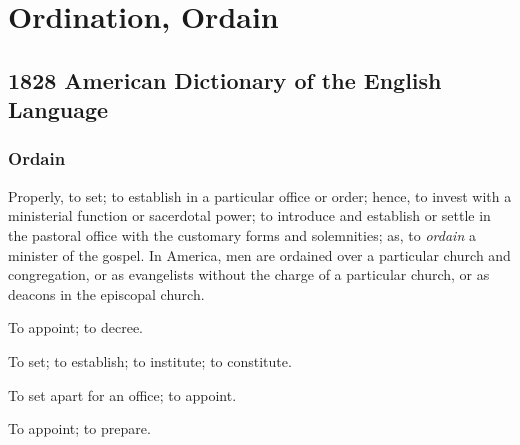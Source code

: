 \section{Ordination, Ordain}
	\label{ORDINATION}
	

\subsection{1828 American Dictionary of the English Language} %
	\label{ORDINATION-1828}
	
	\subsubsection{Ordain}

		\begin{compactitem}
			\item[1] Properly, to set; to establish in a particular office or order; hence, to invest with a ministerial function or sacerdotal power; to introduce and establish or settle in the pastoral office with the customary forms and solemnities; as, to \textit{ordain} a minister of the gospel. In America, men are ordained over a particular church and congregation, or as evangelists without the charge of a particular church, or as deacons in the episcopal church.
			\item[2] To appoint; to decree.
			\item[3] To set; to establish; to institute; to constitute.
			\item[4] To set apart for an office; to appoint.
			\item[5] To appoint; to prepare.
		\end{compactitem}


	
